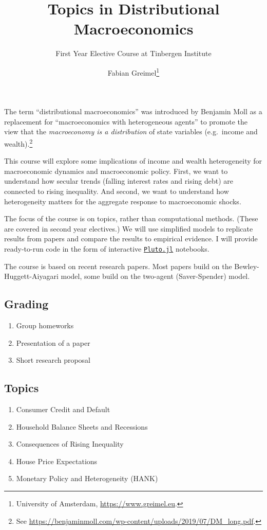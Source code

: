 \documentclass[a4paper,11pt]{article}
\title{Topics in Distributional Macroeconomics}
\date{\vspace{-2ex} Fabian Greimel\thanks{University of Amsterdam, \url{https://www.greimel.eu}.}}
\author{First Year Elective Course at Tinbergen Institute}
\begin{document}
\maketitle

\noindent
The term ``distributional macroeconomics'' was introduced by Benjamin Moll as a replacement for ``macroeconomics with heterogeneous agents'' to promote the view that the \emph{macroeconomy is a distribution} of state variables (e.g.\ income and wealth).\footnote{See \url{ https://benjaminmoll.com/wp-content/uploads/2019/07/DM_long.pdf}.}

This course will explore some implications of income and wealth heterogeneity for macroeconomic dynamics and macroeconomic policy. First, we want to understand how secular trends (falling interest rates and rising debt) are connected to rising inequality. And second, we want to understand how heterogeneity matters for the aggregate response to macroeconomic shocks.

The focus of the course is on topics, rather than computational methods. (These are covered in second year electives.) We will use simplified models to replicate results from papers and compare the results to empirical evidence. I will provide ready-to-run code in the form of interactive \href{https://github.com/fonsp/Pluto.jl}{\texttt{Pluto.jl}} notebooks. 

The course is based on recent research papers. Most papers build on the Bewley-Huggett-Aiyagari model, some build on the two-agent (Saver-Spender) model. 

\subsection*{Grading}

\begin{enumerate}
\item Group homeworks
\item Presentation of a paper
\item Short research proposal
\end{enumerate}

\subsection*{Topics}

\begin{enumerate}
\item Consumer Credit and Default
\item Household Balance Sheets and Recessions
\item Consequences of Rising Inequality
\item House Price Expectations
\item Monetary Policy and Heterogeneity (HANK)
\end{enumerate}
\end{document}

